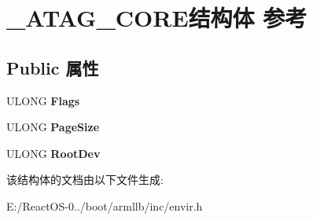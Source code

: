 \hypertarget{struct___a_t_a_g___c_o_r_e}{}\section{\+\_\+\+A\+T\+A\+G\+\_\+\+C\+O\+R\+E结构体 参考}
\label{struct___a_t_a_g___c_o_r_e}
\subsection*{Public 属性}
\begin{DoxyCompactItemize}
\item 
\mbox{\label{struct___a_t_a_g___c_o_r_e_a496c72a5f73d7e835800cbf4585abeb8}} 
U\+L\+O\+NG {\bfseries Flags}
\item 
\mbox{\label{struct___a_t_a_g___c_o_r_e_ab3a1a9ec50931ff4d139fdea61582ec3}} 
U\+L\+O\+NG {\bfseries Page\+Size}
\item 
\mbox{\label{struct___a_t_a_g___c_o_r_e_a5c93db27efaff1813ad377cc769ed6ad}} 
U\+L\+O\+NG {\bfseries Root\+Dev}
\end{DoxyCompactItemize}


该结构体的文档由以下文件生成\+:\begin{DoxyCompactItemize}
\item 
E\+:/\+React\+O\+S-\/0../boot/armllb/inc/envir.\+h\end{DoxyCompactItemize}
